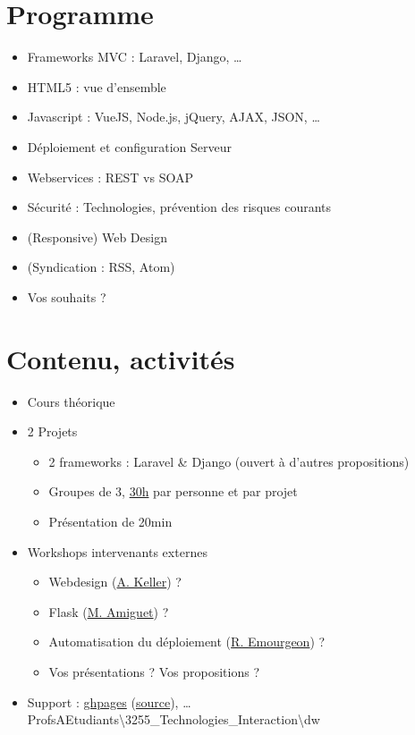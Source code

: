 \hypertarget{programme}{%
\section{Programme}\label{programme}}

\begin{itemize}
\tightlist
\item
  Frameworks MVC : Laravel, Django, \ldots{}
\item
  HTML5 : vue d'ensemble
\item
  Javascript : VueJS, Node.js, jQuery, AJAX, JSON, \ldots{}
\item
  Déploiement et configuration Serveur
\item
  Webservices : REST vs SOAP
\item
  Sécurité : Technologies, prévention des risques courants
\item
  (Responsive) Web Design
\item
  (Syndication : RSS, Atom)
\item
  {Vos souhaits ?}
\end{itemize}

\hypertarget{contenu-activituxe9s}{%
\section{Contenu, activités}\label{contenu-activituxe9s}}

\begin{itemize}
\tightlist
\item
  Cours théorique
\item
  2 Projets

  \begin{itemize}
  \tightlist
  \item
    2 frameworks : Laravel \& Django (ouvert à d'autres propositions)
  \item
    Groupes de 3, \href{https://www.he-arc.ch/reglementation}{30h} par
    personne et par projet
  \item
    Présentation de 20min
  \end{itemize}
\item
  Workshops intervenants externes

  \begin{itemize}
  \tightlist
  \item
    Webdesign (\href{https://www.alinekeller.ch}{A. Keller}) ?
  \item
    Flask (\href{http://www.matthieuamiguet.ch/}{M. Amiguet}) ?
  \item
    Automatisation du déploiement
    (\href{https://www.linkedin.com/in/raphaelemourgeon/}{R. Emourgeon})
    ?
  \item
    {Vos présentations ? Vos propositions ?}
  \end{itemize}
\item
  Support : \href{https://he-arc.github.io/slides-devweb/}{ghpages}
  (\href{https://github.com/HE-Arc/slides-devweb/tree/master/src}{source}),
  \ldots ProfsAEtudiants\textbackslash3255\_Technologies\_Interaction\textbackslash dw
\end{itemize}

